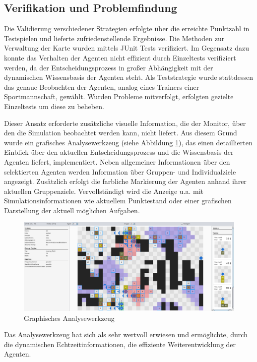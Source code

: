 \documentclass[runningheads]{llncs}
\begin{document}
	
	\subsection{Verifikation und Problemfindung}\label{verifikation}
	Die Validierung verschiedener Strategien erfolgte über die erreichte Punktzahl in Testspielen und lieferte zufriedenstellende Ergebnisse. Die Methoden zur Verwaltung der Karte wurden mittels JUnit Tests \cite{JUnit} verifiziert. Im Gegensatz dazu konnte das Verhalten der Agenten nicht effizient durch Einzeltests verifiziert werden, da der Entscheidungsprozess in großer Abhängigkeit mit der dynamischen Wissensbasis der Agenten steht.
	Als Teststrategie wurde stattdessen das genaue Beobachten der Agenten, analog eines Trainers einer Sportmannschaft, gewählt. Wurden Probleme mitverfolgt, erfolgten gezielte Einzeltests um diese zu beheben.
	
	Dieser Ansatz erforderte zusätzliche visuelle Information, die der Monitor, über den die Simulation beobachtet werden kann, nicht liefert. Aus diesem Grund wurde ein grafisches Analysewerkzeug (siehe Abbildung \ref{debugger}), das einen detaillierten Einblick über den aktuellen Entscheidungsprozess und die Wissensbasis der Agenten liefert, implementiert. Neben allgemeiner Informationen über den selektierten Agenten werden Information über Gruppen- und Individualziele angezeigt. Zusätzlich erfolgt die farbliche Markierung der Agenten anhand ihrer aktuellen Gruppenziele.
	Vervollständigt wird die Anzeige u.a. mit Simulationsinformationen wie aktuellem Punktestand oder einer grafischen Darstellung der aktuell möglichen Aufgaben.
	
	
	\begin{figure}
		\includegraphics[scale=0.091]{./Referenzen/Debugger2.png}
		\caption{Graphisches Analysewerkzeug}
		\label{debugger}
	\end{figure}
	
	Das Analysewerkzeug hat sich als sehr wertvoll erwiesen und ermöglichte, durch die dynamischen Echtzeitinformationen, die effiziente Weiterentwicklung der Agenten.
	
\end{document}
